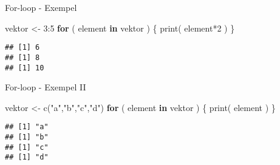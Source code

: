 \documentclass[
  11pt,
  ignorenonframetext,
]{beamer}
\newenvironment{Shaded}{\begin{snugshade}}{\end{snugshade}}
\newcommand{\ControlFlowTok}[1]{\textcolor[rgb]{0.13,0.29,0.53}{\textbf{#1}}}
\newcommand{\DecValTok}[1]{\textcolor[rgb]{0.00,0.00,0.81}{#1}}
\newcommand{\FunctionTok}[1]{\textcolor[rgb]{0.00,0.00,0.00}{#1}}
\newcommand{\NormalTok}[1]{#1}
\newcommand{\OtherTok}[1]{\textcolor[rgb]{0.56,0.35,0.01}{#1}}
\newcommand{\SpecialCharTok}[1]{\textcolor[rgb]{0.00,0.00,0.00}{#1}}
\newcommand{\StringTok}[1]{\textcolor[rgb]{0.31,0.60,0.02}{#1}}
\begin{document}

\begin{frame}[fragile]{For-loop - Exempel}
\protect\hypertarget{for-loop---exempel}{}
\begin{Shaded}
\begin{Highlighting}[]
\NormalTok{vektor }\OtherTok{\textless{}{-}} \DecValTok{3}\SpecialCharTok{:}\DecValTok{5}
\ControlFlowTok{for}\NormalTok{ ( element }\ControlFlowTok{in}\NormalTok{ vektor ) \{}
  \FunctionTok{print}\NormalTok{( element}\SpecialCharTok{*}\DecValTok{2}\NormalTok{ )}
\NormalTok{\}}
\end{Highlighting}
\end{Shaded}

\pause

\begin{verbatim}
## [1] 6
## [1] 8
## [1] 10
\end{verbatim}
\end{frame}


\begin{frame}[fragile]{For-loop - Exempel II}
\protect\hypertarget{for-loop---exempel-ii}{}
\begin{Shaded}
\begin{Highlighting}[]
\NormalTok{vektor }\OtherTok{\textless{}{-}} \FunctionTok{c}\NormalTok{(}\StringTok{"a"}\NormalTok{,}\StringTok{"b"}\NormalTok{,}\StringTok{"c"}\NormalTok{,}\StringTok{"d"}\NormalTok{)}
\ControlFlowTok{for}\NormalTok{ ( element }\ControlFlowTok{in}\NormalTok{ vektor ) \{}
  \FunctionTok{print}\NormalTok{( element )}
\NormalTok{\}}
\end{Highlighting}
\end{Shaded}

\pause

\begin{verbatim}
## [1] "a"
## [1] "b"
## [1] "c"
## [1] "d"
\end{verbatim}
\end{frame}

\end{document}
